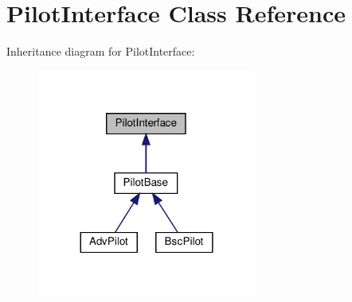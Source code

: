 \hypertarget{classPilotInterface}{}\section{Pilot\+Interface Class Reference}
\label{classPilotInterface}


Inheritance diagram for Pilot\+Interface\+:\nopagebreak
\begin{figure}[H]
\begin{center}
\leavevmode
\includegraphics[width=204pt]{classPilotInterface__inherit__graph}
\end{center}
\end{figure}
